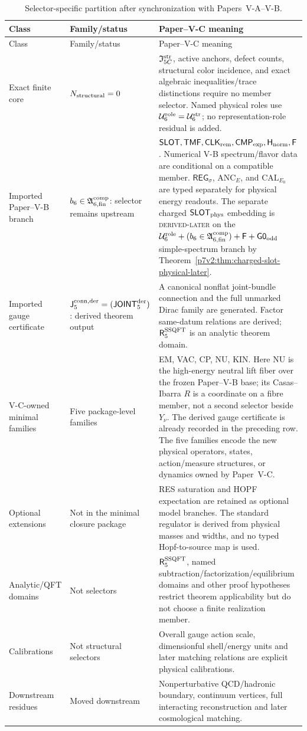 \documentclass[12pt,a4paper]{article}
\newcommand{\Rconn}{\mathsf J_5^{\rm conn,der}}
\newcommand{\Rssqft}{\mathsf R_5^{\rm SSQFT}}
\newcommand{\JOINTfiveocc}{\mathsf{JOINT}_{5}^{\rm der}}
\newcommand{\REGsig}{\mathsf{REG}_{\sigma}}
\newcommand{\Ustr}{\mathcal U_6^{\rm str}}
\newcommand{\Urole}{\mathcal U_6^{\rm role}}
\newcommand{\Istr}{\mathfrak I_{5C}^{\rm str}}
\newcommand{\Acompsix}{\mathfrak A_{6,{\rm fin}}^{\rm comp}}
\newcommand{\CMPexp}{\mathsf{CMP}_{\rm exp}}
\begin{document}
\begin{longtable}{@{}L{0.20\textwidth}L{0.25\textwidth}L{0.47\textwidth}@{}}
\caption[Paper--V-C selector ledger]{Selector-specific partition after
synchronization with Papers~V-A--V-B.}\label{p7v2:tab:selector-ledger}\\
\toprule
Class & Family/status & Paper--V-C meaning\\
\midrule
\endfirsthead
\toprule
Class & Family/status & Paper--V-C meaning\\
\midrule
\endhead
Exact finite core
& \(N_{\rm structural}=0\)
& \(\Istr\), active anchors, defect counts, structural color incidence, and
exact algebraic inequalities/trace distinctions require no member selector.
Named physical roles use \(\Urole=\Ustr\); no representation-role residual is added.\\
Imported Paper--V-B branch
& \(b_6\in\Acompsix\): selector remains upstream
& \(\mathsf{SLOT},\mathsf{TMF},\mathsf{CLK}_{\rm rem},\CMPexp,
\mathsf H_{\rm norm},\mathsf F\).  Numerical V-B spectrum/flavor data are
conditional on a compatible member.  \(\REGsig\), \(\mathrm{ANC}_E\), and
\(\mathrm{CAL}_{E_0}\) are typed separately for physical energy readouts.  The separate charged
\(\mathsf{SLOT}_{\rm phys}\) embedding is \textsc{derived-later} on the
\(\Urole+(b_6\in\Acompsix)+\mathsf F+\mathsf{G0}_{\rm odd}\) simple-spectrum branch by
Theorem~\ref{p7v2:thm:charged-slot-physical-later}.\\
Imported gauge certificate
& \(\Rconn=(\JOINTfiveocc)\): derived theorem output
& A canonical nonflat joint-bundle connection and the full unmarked Dirac
family are generated.  Factor same-datum relations are derived;
\(\Rssqft\) is an analytic theorem domain.\\
V-C-owned minimal families
& Five package-level families
& EM, VAC, CP, NU, KIN.  Here NU is the high-energy neutral lift fiber over
the frozen Paper--V-B base; its Casas--Ibarra \(R\) is a coordinate on a fibre
member, not a second selector beside \(Y_\nu\).  The derived gauge certificate
is already recorded in the preceding row.  The five families encode the new
physical operators, states, action/measure structures, or dynamics owned by
Paper~V-C.\\
Optional extensions
& Not in the minimal closure package
& RES saturation and HOPF expectation are retained as optional model branches.
The standard regulator is derived from physical masses and widths, and no
typed Hopf-to-source map is used.\\
Analytic/QFT domains
& Not selectors
& \(\Rssqft\), named subtraction/factorization/equilibrium domains and other
proof hypotheses restrict theorem applicability but do not choose a finite
realization member.\\
Calibrations
& Not structural selectors
& Overall gauge action scale, dimensionful shell/energy units and later
matching relations are explicit physical calibrations.\\
Downstream residues
& Moved downstream
& Nonperturbative QCD/hadronic boundary, continuum vertices, full interacting
reconstruction and later cosmological matching.\\
\bottomrule
\end{longtable}
\end{document}
